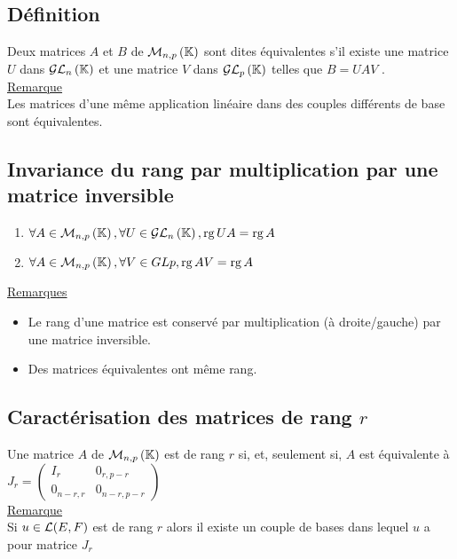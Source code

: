 \subsection{Définition}
\begin{defi}
    Deux matrices \(A\) et \(B\) de \(\M{n,p}\) sont dites équivalentes s’il existe une matrice \(U\) dans \(\GL{n}\) et une matrice \(V\) dans \(\GL{p}\) telles que \(B = U AV\) .\\
    \underline{Remarque} \\
    Les matrices d’une même application linéaire dans des couples différents de base sont équivalentes.
\end{defi}
\subsection{Invariance du rang par multiplication par une matrice inversible}
\begin{defprop}
    \begin{enumerate}
        \item \(\forall A \in \M{n,p}, \forall U \in \GL{n}, \rg U A = \rg A\)
        \item \(\forall A \in \M{n,p}, \forall V \in GL{p}, \rg AV = \rg A\)
    \end{enumerate}
    \underline{Remarques} \\
    \begin{itemize}
        \item Le rang d’une matrice est conservé par multiplication (à droite/gauche) par une matrice inversible.
        \item Des matrices équivalentes ont même rang.
    \end{itemize}
\end{defprop}
\subsection{Caractérisation des matrices de rang \(r\)}
\begin{defprop}
    Une matrice \(A\) de \(\M{n,p}\) est de rang \(r\) si, et, seulement si, \(A\) est équivalente à \(J_r =
    \left( \begin{array}{cc}
    I_r & 0_{r,p-r} \\
    0_{n-r,r} & 0_{n-r,p-r}        
    \end{array} \right)\) \\
    \underline{Remarque} \\
    Si \(u \in \cal{L}(E, F )\) est de rang \(r\) alors il existe un couple de bases dans lequel \(u\) a pour matrice \(J_r\)
\end{defprop}
